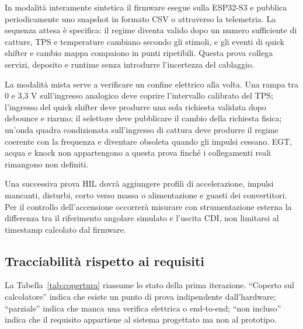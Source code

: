 \documentclass{article}
\begin{document}
In modalità interamente sintetica il firmware esegue sulla ESP32-S3 e pubblica
periodicamente uno snapshot in formato CSV o attraverso la telemetria. La sequenza attesa è
specifica: il regime diventa valido dopo un numero sufficiente di catture, TPS e
temperature cambiano secondo gli stimoli, e gli eventi di quick shifter e cambio
mappa compaiono in punti ripetibili. Questa prova collega servizi, deposito e
runtime senza introdurre l'incertezza del cablaggio.

La modalità mista serve a verificare un confine elettrico alla volta. Una rampa
tra 0 e 3,3 V sull'ingresso analogico deve coprire l'intervallo calibrato del
TPS; l'ingresso del quick shifter deve produrre una sola richiesta validata
dopo debounce e riarmo; il selettore deve pubblicare il cambio della richiesta
fisica; un'onda quadra condizionata sull'ingresso di cattura deve produrre il
regime coerente con la frequenza e diventare obsoleta quando gli impulsi
cessano. EGT, acqua e knock non appartengono a questa prova
finché i collegamenti reali rimangono non definiti.

Una successiva prova HIL dovrà aggiungere profili di accelerazione, impulsi
mancanti, disturbi, corto verso massa o alimentazione e guasti dei convertitori.
Per il controllo dell'accensione occorrerà misurare con strumentazione esterna
la differenza tra il riferimento angolare simulato e l'uscita CDI, non limitarsi
al timestamp calcolato dal firmware.

\subsection{Tracciabilità rispetto ai requisiti}

La Tabella~\ref{tab:copertura} riassume lo stato della prima iterazione. ``Coperto
sul calcolatore'' indica che esiste un punto di prova indipendente dall'hardware;
``parziale'' indica che manca una verifica elettrica o end-to-end; ``non incluso''
indica che il requisito appartiene al sistema progettato ma non al prototipo.
\end{document}
